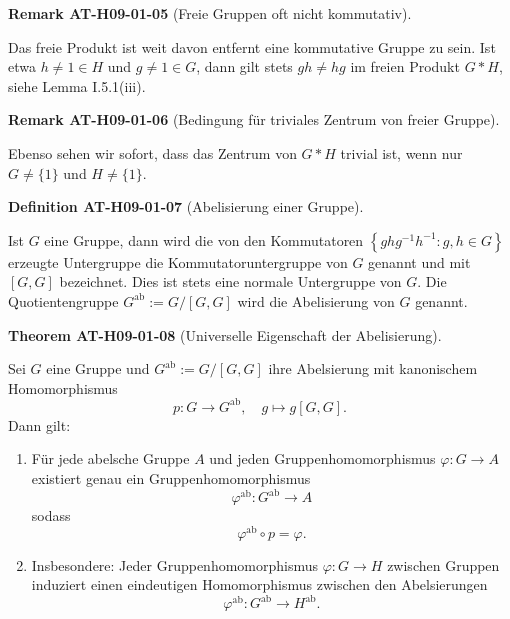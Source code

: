 \documentclass[10pt, letterpaper]{article}
\newcommand{\CustomHeading}[3]{%
  \par\medskip\noindent%
  \textbf{#1 #2} \textnormal{(#3)}.\enskip%
}
\newenvironment{DEF}[2]{\CustomHeading{Definition}{#1}{#2}}{}
\newenvironment{THEO}[2]{\CustomHeading{Theorem}{#1}{#2}}{}
\newenvironment{REM}[2]{\CustomHeading{Remark}{#1}{#2}}{}
\begin{document}
\begin{REM}{AT-H09-01-05}{Freie Gruppen oft nicht kommutativ}
Das freie Produkt ist weit davon entfernt eine kommutative Gruppe zu sein. Ist etwa $h \neq 1 \in H$ und $g \neq 1 \in G$, dann gilt stets $g h \neq h g$ im freien Produkt $G * H$, siehe Lemma I.5.1(iii).
\end{REM}

\begin{REM}{AT-H09-01-06}{Bedingung für triviales Zentrum von freier Gruppe}
Ebenso sehen wir sofort, dass das Zentrum von $G * H$ trivial ist, wenn nur $G \neq\{1\}$ und $H \neq\{1\}$.
\end{REM}

\begin{DEF}{AT-H09-01-07}{Abelisierung einer Gruppe}
Ist $G$ eine Gruppe, dann wird die von den Kommutatoren $\left\{g h g^{-1} h^{-1}: g, h \in G\right\}$ erzeugte Untergruppe die Kommutatoruntergruppe von $G$ genannt und mit $[G, G]$ bezeichnet. Dies ist stets eine normale Untergruppe von $G$. Die Quotientengruppe $G^{\mathrm{ab}}:=G /[G, G]$ wird die Abelisierung von $G$ genannt.
\end{DEF}

\begin{THEO}{AT-H09-01-08}{Universelle Eigenschaft der Abelisierung}
Sei $G$ eine Gruppe und $G^{\mathrm{ab}} := G/[G, G]$ ihre Abelsierung mit kanonischem Homomorphismus
\[
p: G \rightarrow G^{\mathrm{ab}}, \quad g \mapsto g [G, G].
\]
Dann gilt:

\begin{enumerate}
  \item Für jede abelsche Gruppe $A$ und jeden Gruppenhomomorphismus $\varphi: G \rightarrow A$ existiert genau ein Gruppenhomomorphismus
  \[
  \varphi^{\mathrm{ab}}: G^{\mathrm{ab}} \rightarrow A
  \]
  sodass
  \[
  \varphi^{\mathrm{ab}} \circ p = \varphi.
  \]
  \item Insbesondere: Jeder Gruppenhomomorphismus $\varphi: G \rightarrow H$ zwischen Gruppen induziert einen eindeutigen Homomorphismus zwischen den Abelsierungen
  \[
  \varphi^{\mathrm{ab}}: G^{\mathrm{ab}} \rightarrow H^{\mathrm{ab}}.
  \]
\end{enumerate}
\end{THEO}
\end{document}
